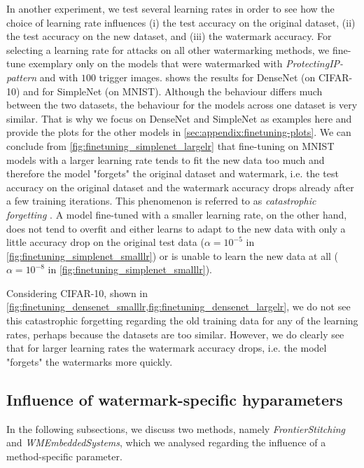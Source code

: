 

In another experiment, we test several learning rates in order to see how the choice of learning rate influences (i) the test accuracy on the original dataset, (ii) the test accuracy on the new dataset, and (iii) the watermark accuracy. For selecting a learning rate for attacks on all other watermarking methods, we fine-tune exemplary only on the models that were watermarked with \textit{ProtectingIP-pattern} and with $100$ trigger images.  shows the results for DenseNet (on CIFAR-10) and for SimpleNet (on MNIST). Although the behaviour differs much between the two datasets, the behaviour for the models across one dataset is very similar. That is why we focus on DenseNet and SimpleNet as examples here and provide the plots for the other models in \cref{sec:appendix:finetuning-plots}. We can conclude from \cref{fig:finetuning_simplenet_largelr} that fine-tuning on MNIST models with a larger learning rate tends to fit the new data too much and therefore the model "forgets" the original dataset and watermark, i.e. the test accuracy on the original dataset and the watermark accuracy drops already after a few training iterations. This phenomenon is referred to as \textit{catastrophic forgetting} \cite{kirkpatrick_overcoming_2017}. A model fine-tuned with a smaller learning rate, on the other hand, does not tend to overfit and either learns to adapt to the new data with only a little accuracy drop on the original test data ($\alpha=10^{-5}$ in \cref{fig:finetuning_simplenet_smalllr}) or is unable to learn the new data at all ($\alpha=10^{-8}$ in \cref{fig:finetuning_simplenet_smalllr}).

Considering CIFAR-10, shown in \cref{fig:finetuning_densenet_smalllr,fig:finetuning_densenet_largelr}, we do not see this catastrophic forgetting regarding the old training data for any of the learning rates, perhaps because the datasets are too similar. However, we do clearly see that for larger learning rates the watermark accuracy drops, i.e. the model "forgets" the watermarks more quickly.

\subsection{Influence of watermark-specific hyparameters} \label{sec:eval-watermark-spec-param}

In the following subsections, we discuss two methods, namely \textit{FrontierStitching} and \textit{WMEmbeddedSystems}, which we analysed regarding the influence of a method-specific parameter.

